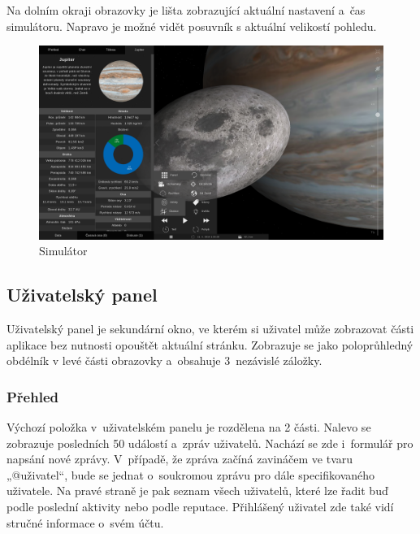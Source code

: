 \documentclass[a4paper,12pt]{article}
\begin{document}
Na dolním okraji obrazovky je lišta zobrazující aktuální nastavení a~čas simulátoru. Napravo je možné vidět posuvník s aktuální velikostí pohledu.

\begin{figure}[H]
\begin{center}
\includegraphics[width=450pt]{Images/Simulator.png}
\caption{Simulátor}
\end{center}
\end{figure}

\vspace*{-1cm}
\subsection{Uživatelský panel}

Uživatelský panel je sekundární okno, ve kterém si uživatel může zobrazovat části aplikace bez nutnosti opouštět aktuální stránku. Zobrazuje se jako poloprůhledný obdélník v levé části obrazovky a~obsahuje 3~nezávislé záložky.

\subsubsection{Přehled}

Výchozí položka v~uživatelském panelu je rozdělena na 2 části. Nalevo se zobrazuje posledních 50 událostí a~zpráv uživatelů. Nachází se zde i~formulář pro napsání nové zprávy. V~případě, že zpráva začíná zavináčem ve tvaru „@uživatel“, bude se jednat o~soukromou zprávu pro dále specifikovaného uživatele. Na pravé straně je pak seznam všech uživatelů, které lze řadit buď podle poslední aktivity nebo podle reputace. Přihlášený uživatel zde také vidí stručné informace o~svém účtu.
\end{document}
